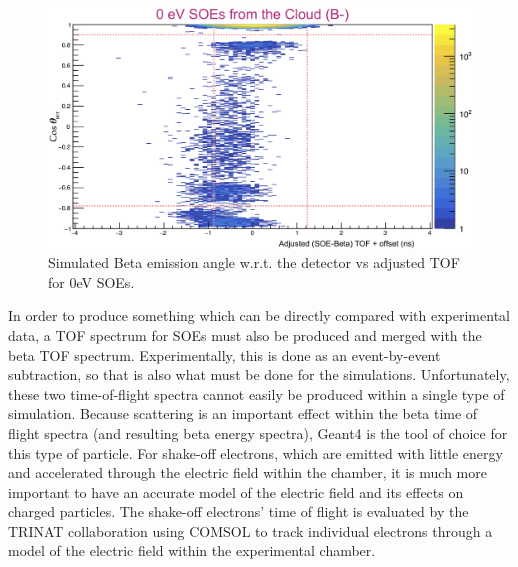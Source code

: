 \begin{figure}[h!tb]
	\centering
	\includegraphics[width=.999\linewidth]
	{Figures/fig_2D_SOE_TOF_0eV.png}
	\caption[Simulated Beta emission angle w.r.t. the detector vs adjusted 0eV SOE TOF]{Simulated Beta emission angle w.r.t. the detector vs adjusted TOF for 0eV SOEs.  %
	}	
	\label{fig:soe_tof_vs_costheta_0eV}
\end{figure}



%
In order to produce something which can be directly compared with experimental data, a TOF spectrum for SOEs must also be produced and merged with the beta TOF spectrum.  Experimentally, this is done as an event-by-event subtraction, so that is also what must be done for the simulations.  Unfortunately, these two time-of-flight spectra cannot easily be produced within a single type of simulation.  Because scattering is an important effect within the beta time of flight spectra (and resulting beta energy spectra), Geant4 is the tool of choice for this type of particle.  For shake-off electrons, which are emitted with little energy and accelerated through the electric field within the chamber, it is much more important to have an accurate model of the electric field and its effects on charged particles.  The shake-off electrons' time of flight is evaluated by the TRINAT collaboration using COMSOL to track individual electrons through a model of the electric field within the experimental chamber.  

